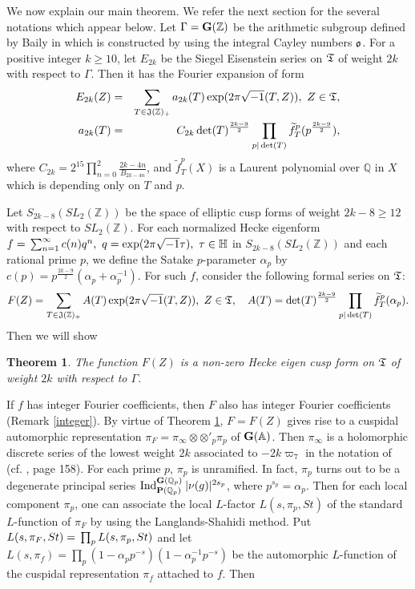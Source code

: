 \documentclass[11pt]{amsart}
\numberwithin{equation}{section}
\newtheorem{theorem}{Theorem}[section]
\theoremstyle{definition}
\begin{document}
We now explain our main theorem. We refer the next section for the several notations which appear below.  
Let $\Gamma=\bold{G}({\mathbb{Z}})$ be the arithmetic subgroup defined by Baily in \cite{B} which is 
constructed by using the integral Cayley numbers $\frak o$. 
For a positive integer $k\ge 10$, let $E_{2k}$ be the Siegel Eisenstein series on $\frak T$ of 
weight $2k$ with respect to $\Gamma$. Then it has the Fourier expansion of form 
\begin{eqnarray*}
E_{2k}(Z) &=& \sum_{T\in \frak J({\mathbb{Z}})_+} a_{2k}(T) \exp(2\pi\sqrt{-1}(T,Z)),\ Z\in\frak T,\\
a_{2k}(T) &=& C_{2k}\det(T)^{\frac{2k-9}{2}}\prod_{p|\det(T)} \widetilde{f}^p_T(p^{\frac{2k-9}{2}}),
\end{eqnarray*}
where $C_{2k}=2^{15}\displaystyle\prod_{n=0}^2 \frac {2k-4n}{B_{2k-4n}}$, and 
$\widetilde{f}^p_T(X)$ is a Laurent polynomial over ${\mathbb{Q}}$ in $X$ which is depending only on $T$ and $p$.  

Let $S_{2k-8}(SL_2({\mathbb{Z}}))$ be the space of elliptic cusp forms of weight $2k-8\geq 12$ with respect to $SL_2({\mathbb{Z}})$.  
For each normalized Hecke eigenform $f={\displaystyle}\sum_{n=1}^\infty c(n)q^n,\ q=\exp(2\pi \sqrt{-1}\tau),\ \tau\in \mathbb{H}$ in $S_{2k-8}(SL_2({\mathbb{Z}}))$ and each rational prime $p$, 
we define the Satake $p$-parameter $\alpha_p$ by $c(p)=p^{\frac{2k-9}{2}}(\alpha_p+\alpha^{-1}_p)$. 
For such $f$, consider the following formal series on $\frak T$: 
$$F(Z)=\sum_{T\in \frak J({\mathbb{Z}})_+} A(T)\exp(2\pi\sqrt{-1}(T,Z)),\ Z\in \frak T, \quad 
A(T)=\det(T)^{\frac{2k-9}{2}} \prod_{p|\det(T)} \widetilde{f}_T^p(\alpha_p).
$$
Then we will show 
\begin{theorem}\label{main-thm1} The function $F(Z)$ is a non-zero Hecke eigen cusp form on $\frak T$ of weight $2k$ with respect to 
${\Gamma}$. 
\end{theorem}
If $f$ has integer Fourier coefficients, then $F$ also has integer Fourier coefficients (Remark \ref{integer}).
By virtue of Theorem \ref{main-thm1}, $F=F(Z)$ gives rise to a cuspidal automorphic representation 
$\pi_F=\pi_\infty\otimes \otimes'_p\pi_p$ 
of $\bold G({\mathbb{A}})$. Then $\pi_\infty$ is a holomorphic discrete series of the lowest weight $2k$ associated to $-2k\varpi_7$ in the notation of \cite{Bour} (cf. \cite{knapp}, page 158).
For each prime $p$, $\pi_p$ is unramified. In fact, $\pi_p$ turns out to be a degenerate principal series 
${\rm Ind}_{\bold{P}({\mathbb{Q}}_p)}^{\bold{G}({\mathbb{Q}}_p)}\: |\nu(g)|^{2s_p}$, where $p^{s_p}=\alpha_p$. 
Then for each local component $\pi_p$, one can associate the local $L$-factor $L(s,\pi_p,St)$ of the standard $L$-function of $\pi_F$
 by using the Langlands-Shahidi method. 
Put $L(s,\pi_F,St)={\displaystyle}\prod_p L(s,\pi_p,St)$ and let 
$L(s,\pi_f)=\prod_p (1-\alpha_p p^{-s})(1-\alpha_p^{-1} p^{-s})$ be the 
automorphic $L$-function of the cuspidal representation $\pi_f$ attached to $f$. Then
\end{document}
